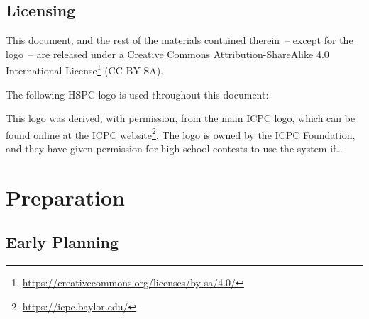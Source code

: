 \documentclass[11pt,twoside,letterpaper]{book}
\newcommand{\footurl}[1]{\footnote{\scriptsize\url{#1}}}
\begin{document}
\section{Licensing}

This document, and the rest of the materials contained therein~--
except for the logo~-- are released under a Creative Commons
Attribution-ShareAlike 4.0 International
License\footurl{https://creativecommons.org/licenses/by-sa/4.0/} (CC
BY-SA).

The following HSPC logo is used throughout this document:

\begin{center}
\end{center}

This logo was derived, with permission, from the main ICPC logo, which
can be found online at the ICPC
website\footurl{https://icpc.baylor.edu/}.  The logo is owned by the
ICPC Foundation, and they have given permission for high school
contests to use the system if\ldots



\cleardoublepage
\chapter{Preparation}

\section{Early Planning}
\end{document}
